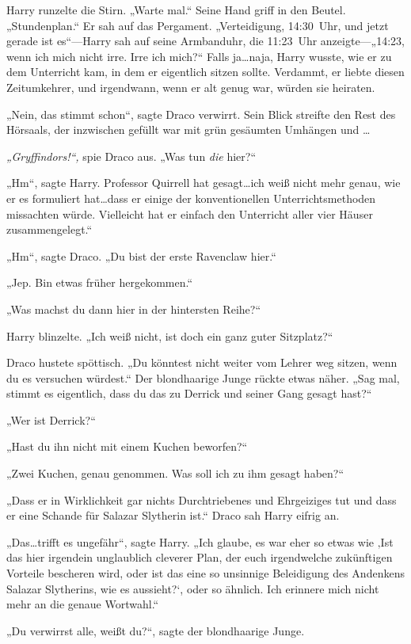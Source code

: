 {Harry runzelte die Stirn. „Warte mal.“ Seine Hand griff in den Beutel. „Stundenplan.“ Er sah auf das Pergament. „Verteidigung, 14:30~Uhr, und jetzt gerade ist es“—Harry sah auf seine Armbanduhr, die 11:23~Uhr anzeigte—„14:23, wenn ich mich nicht irre. Irre ich mich?“ Falls ja…naja, Harry wusste, wie er zu dem Unterricht kam, in dem er eigentlich sitzen sollte. Verdammt, er liebte diesen Zeitumkehrer, und irgendwann, wenn er alt genug war, würden sie heiraten.

„Nein, das stimmt schon“, sagte Draco verwirrt. Sein Blick streifte den Rest des Hörsaals, der inzwischen gefüllt war mit grün gesäumten Umhängen und …

\emph{„Gryffindors!“,} spie Draco aus. „Was tun \emph{die} hier?“

„Hm“, sagte Harry. Professor Quirrell hat gesagt…ich weiß nicht mehr genau, wie er es formuliert hat…dass er einige der konventionellen Unterrichtsmethoden missachten würde. Vielleicht hat er einfach den Unterricht aller vier Häuser zusammengelegt.“

„Hm“, sagte Draco. „Du bist der erste Ravenclaw hier.“

„Jep. Bin etwas früher hergekommen.“

„Was machst du dann hier in der hintersten Reihe?“

Harry blinzelte. „Ich weiß nicht, ist doch ein ganz guter Sitzplatz?“

Draco hustete spöttisch. „Du könntest nicht weiter vom Lehrer weg sitzen, wenn du es versuchen würdest.“ Der blondhaarige Junge rückte etwas näher. „Sag mal, stimmt es eigentlich, dass du das zu Derrick und seiner Gang gesagt hast?“

„Wer ist Derrick?“

„Hast du ihn nicht mit einem Kuchen beworfen?“

„Zwei Kuchen, genau genommen. Was soll ich zu ihm gesagt haben?“

„Dass er in Wirklichkeit gar nichts Durchtriebenes und Ehrgeiziges tut und dass er eine Schande für Salazar Slytherin ist.“ Draco sah Harry eifrig an.

„Das…trifft es ungefähr“, sagte Harry. „Ich glaube, es war eher so etwas wie ‚Ist das hier irgendein unglaublich cleverer Plan, der euch irgendwelche zukünftigen Vorteile bescheren wird, oder ist das eine so unsinnige Beleidigung des Andenkens Salazar Slytherins, wie es aussieht?`, oder so ähnlich. Ich erinnere mich nicht mehr an die genaue Wortwahl.“

„Du verwirrst alle, weißt du?“, sagte der blondhaarige Junge.

}
